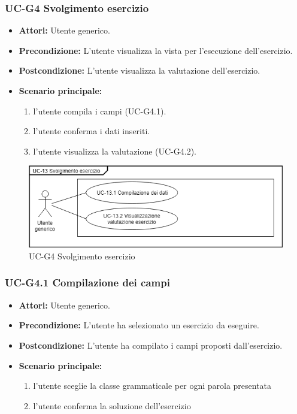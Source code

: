 	\subsubsection{UC-G4 Svolgimento esercizio}
		\begin{itemize}
			\item \textbf{Attori:} Utente generico.
			\item \textbf{Precondizione:}  L'utente visualizza la vista per l'esecuzione dell'esercizio.
			\item \textbf{Postcondizione:} L'utente visualizza la valutazione dell'esercizio.
			\item \textbf{Scenario principale:}
				\begin{enumerate}
					\item l'utente compila i campi (UC-G4.1).
					\item l'utente conferma i dati inseriti.
					\item l'utente visualizza la valutazione (UC-G4.2).
				\end{enumerate}
		\end{itemize}
			
		\begin{figure}[h]
			\centering
			\includegraphics[scale=0.7]{images/UC-13.png}
			\caption{UC-G4 Svolgimento esercizio}
		\end{figure}

	\subsubsection{UC-G4.1 Compilazione dei campi}
		\begin{itemize}
			\item \textbf{Attori:} Utente generico.
			\item \textbf{Precondizione:} L'utente ha selezionato un esercizio da eseguire.
			\item \textbf{Postcondizione:} L'utente ha compilato i campi proposti dall'esercizio.
			\item \textbf{Scenario principale:}
				\begin{enumerate}
					\item l'utente sceglie la classe grammaticale per ogni parola presentata
					\item l'utente conferma la soluzione dell'esercizio
				\end{enumerate}
		\end{itemize}
		
